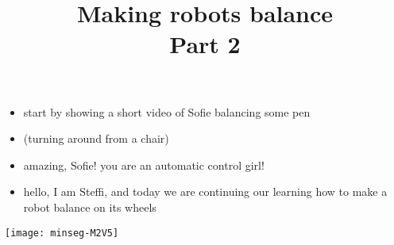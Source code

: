 \newif	\ifexternalize					%
\newif	\ifshowonlynotes				%
\newif	\ifhandout						%
\newif	\ifshowsolutions				%
\newif	\ifshownotes					%
\ifdefined\EXTERNALIZE	\externalizetrue	\fi						%
\ifdefined\ONLYNOTES	\showonlynotestrue	\fi						%
\ifdefined\HANDOUT		\handouttrue		\fi						%
\ifdefined\SOLUTIONS	\showsolutionstrue	\fi						%
\ifdefined\NOTES		\shownotestrue		\fi						%
\title		[Balancing Robots]	{Making robots balance \\ Part 2}	%
\date		{} %


\begin{frame}
	\begin{itemize}
		\item start by showing a short video of Sofie balancing some pen
	\end{itemize}
\end{frame}


\begin{frame}
	\begin{itemize}
		\item (turning around from a chair)
		\item amazing, Sofie! you are an automatic control girl!
		\item hello, I am Steffi, and today we are continuing our learning how to make a robot balance on its wheels
	\end{itemize}
\end{frame}


\begin{frame}
	\titlepage
	\begin{center}
		\texttt{[image: minseg-M2V5]}
	\end{center}
\end{frame}


